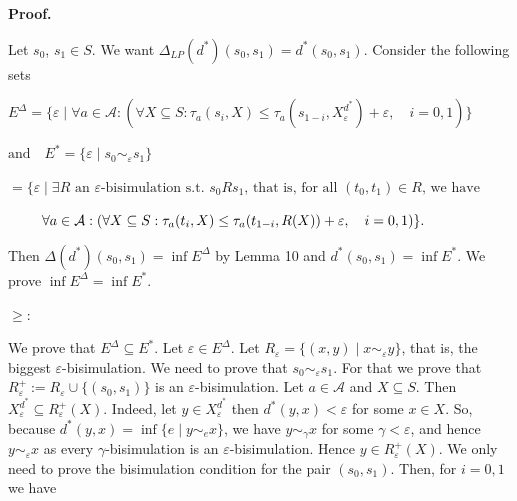 \documentclass[10pt,a4paper]{article}
\begin{document}
 
 
 


 
\par\medskip\noindent\textbf{Proof.}\par
 
 
Let $s_{0}$, $s_{1}\in S$. We want $\Delta_{LP}(d^{*})(s_{0},s_{1})=d^{*}(s_{0},s_{1})$. Consider the following sets\par
  
\par  \quad  $\displaystyle E^{\Delta}$\quad  $\displaystyle=\{\varepsilon\mid\forall a\in\mathcal{A}:(\forall X\subseteq S:\tau_{a}(s_{i},X)\leq\tau_{a}(s_{1-i},X^{d^{*}}_{\varepsilon})+\varepsilon,\quad i=0,1)\}$\quad  \quad  
 
\par  \quad  $\displaystyle\mbox{and}\quad E^{*}$\quad  $\displaystyle=\{\varepsilon\mid s_{0}\sim_{\varepsilon}s_{1}\}$\quad  \quad  
 
\par  \quad  \quad  $\displaystyle=\{\varepsilon\mid\exists R\mbox{ an $\varepsilon$-bisimulation s.t. $s_{0}Rs_{1}$, that is, for all $(t_{0},t_{1})\in R$, we have}$\quad  \quad  
 
\par  \quad  \quad  $\displaystyle\mbox{\nobreak\ \nobreak\ \nobreak\ \nobreak\ }\quad\forall a\in\mathcal{A}:(\forall X\subseteq S:\tau_{a}(t_{i},X)\leq\tau_{a}(t_{1-i},R(X))+\varepsilon,\quad i=0,1)\}.$\quad  \quad  
  
Then $\Delta(d^{*})(s_{0},s_{1})=\inf E^{\Delta}$ by Lemma 10 and $d^{*}(s_{0},s_{1})=\inf E^{*}\!$. We prove $\inf E^{\Delta}=\inf E^{*}\!$.\par
  $\geq$:  
 
We prove that $E^{\Delta}\subseteq E^{*}$. Let $\varepsilon\in E^{\Delta}$. Let $R_{\varepsilon}=\{(x,y)\mid x\sim_{\varepsilon}y\}$, that is, the biggest $\varepsilon$-bisimulation. We need to prove that $s_{0}\sim_{\varepsilon}s_{1}$. For that we prove that $R_{\varepsilon}^{+}:=R_{\varepsilon}\cup\{(s_{0},s_{1})\}$ is an $\varepsilon$-bisimulation. Let $a\in\mathcal{A}$ and $X\subseteq S$. Then $X_{\varepsilon}^{d^{*}}\subseteq R^{+}_{\varepsilon}(X)$. Indeed, let $y\in X_{\varepsilon}^{d^{*}}$ then $d^{*}(y,x)<\varepsilon$ for some $x\in X$. So, because $d^{*}(y,x)=\inf\{e\mid y\sim_{e}x\}$, we have $y\sim_{\gamma}x$ for some $\gamma<\varepsilon$, and hence $y\sim_{\varepsilon}x$ as every $\gamma$-bisimulation is an $\varepsilon$-bisimulation. Hence $y\in R^{+}_{\varepsilon}(X).$ We only need to prove the bisimulation condition for the pair $(s_{0},s_{1})$. Then, for $i=0,1$ we have\par
  
\end{document}
